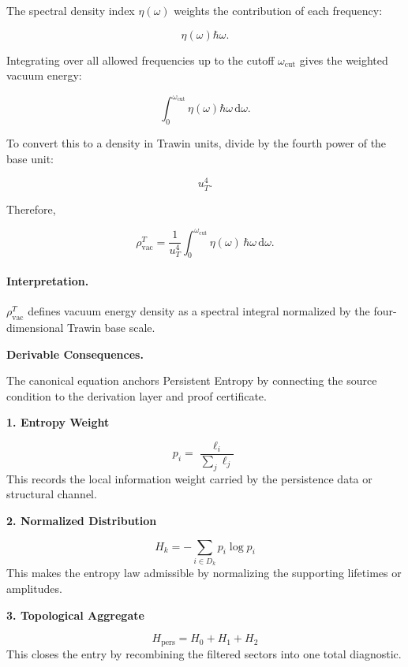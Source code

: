 The spectral density index $\eta(\omega)$ weights the contribution of each frequency:

\begin{equation}
\eta(\omega)\hbar\omega .
\end{equation}

Integrating over all allowed frequencies up to the cutoff $\omega_{\mathrm{cut}}$ gives the weighted vacuum energy:

\begin{equation}
\int_{0}^{\omega_{\mathrm{cut}}}
\eta(\omega)\hbar\omega\,\mathrm{d}\omega .
\end{equation}

To convert this to a density in Trawin units, divide by the fourth power of the base unit:

\begin{equation}
u_T^4 .
\end{equation}

Therefore,

\begin{equation}
\boxed{
\rho_{\mathrm{vac}}^{T}
=
\frac{1}{u_T^4}
\int_{0}^{\omega_{\mathrm{cut}}}
\eta(\omega)\,
\hbar\omega\,
\mathrm{d}\omega .
}
\end{equation}

\paragraph{Interpretation.}
$\rho_{\mathrm{vac}}^{T}$ defines vacuum energy density as a spectral integral normalized by the four-dimensional Trawin base scale.

\par\vspace{0.35em}
\noindent\textbf{Derivable Consequences.}\quad
\begingroup
\footnotesize
\raggedright
The canonical equation anchors Persistent Entropy by connecting the source condition to the derivation layer and proof certificate.
\par\endgroup

\noindent\textbf{1. Entropy Weight}\par
\[
p_i=\frac{\ell_i}{\sum_j \ell_j}
\]
\noindent This records the local information weight carried by the persistence data or structural channel.\par
\noindent\textbf{2. Normalized Distribution}\par
\[
H_k=-\sum_{i\in D_k}p_i\log p_i
\]
\noindent This makes the entropy law admissible by normalizing the supporting lifetimes or amplitudes.\par
\noindent\textbf{3. Topological Aggregate}\par
\[
H_{\mathrm{pers}}=H_0+H_1+H_2
\]
\noindent This closes the entry by recombining the filtered sectors into one total diagnostic.\par

